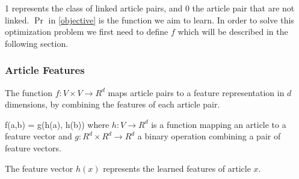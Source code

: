 1 represents the class of linked article pairs, and 0 the article pair that are not linked. $\Pr$ in \cref{objective} is the function we aim to learn. In order to solve this optimization problem we first need to define $f$ which will be described in the following section.

\subsubsection{Article Features}

The function $f: V\times V \to R^d$ maps article pairs to a feature representation in $d$ dimensions, by combining the features of each article pair.

f(a,b) = g(h(a), h(b)) where $h: V \to R^d$ is a function mapping an article to a feature vector and $g: R^d \times R^d \to R^d$ a binary operation combining a pair of feature vectors.

The feature vector $h(x)$ represents the learned features of article $x$.







